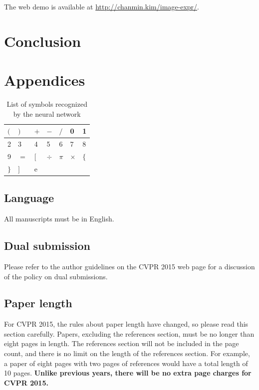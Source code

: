 \documentclass[10pt,twocolumn,letterpaper]{article}
\begin{document}
The web demo is available at \url{http://chanmin.kim/image-expr/}.

\section{Conclusion}

{\small


}

\section{Appendices}

\begin{table}[h]
\centering
\begin{tabular}{|l|l|l|l|l|l|l|}
\hline
$($ & $)$ & $+$ & $-$ & $/$ & 0 & 1 \\ \hline
2 & 3 & 4 & 5 & 6 & 7 & 8 \\ \hline
9 & $=$ & $[$ & $\div$ & $\pi$ & $\times$ & $\{$ \\ \hline
$\}$ & $]$ & e & $ $ & $ $ & & \\
\hline
\end{tabular}
\caption{List of symbols recognized by the neural network}
\label{tbl:symbollist}
\end{table}



\subsection{Language}

All manuscripts must be in English.

\subsection{Dual submission}

Please refer to the author guidelines on the CVPR 2015 web page for a
discussion of the policy on dual submissions.

\subsection{Paper length}
For CVPR 2015, the rules about paper length have changed, so please
read this section carefully. Papers, excluding the references section,
must be no longer than eight pages in length. The references section
will not be included in the page count, and there is no limit on the
length of the references section. For example, a paper of eight pages
with two pages of references would have a total length of 10 pages.
{\bf Unlike previous years, there will be no extra page charges for
  CVPR 2015.}
\end{document}
